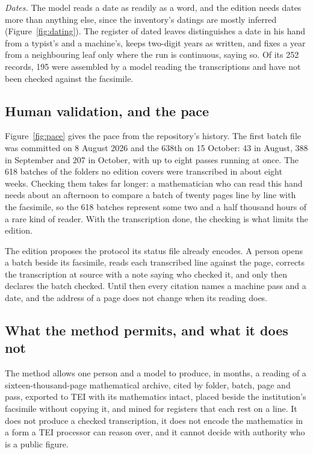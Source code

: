 \documentclass[11pt]{article}
\begin{document}
\emph{Dates.} The model reads a date as readily as a word, and the edition needs dates more than anything else, since the inventory's datings are mostly inferred (Figure~\ref{fig:dating}). The register of dated leaves distinguishes a date in his hand from a typist's and a machine's, keeps two-digit years as written, and fixes a year from a neighbouring leaf only where the run is continuous, saying so. Of its 252 records, 195 were assembled by a model reading the transcriptions and have not been checked against the facsimile.

\subsection{Human validation, and the pace}



Figure~\ref{fig:pace} gives the pace from the repository's history. The first batch file was committed on 8 August 2026 and the 638th on 15 October: 43 in August, 388 in September and 207 in October, with up to eight passes running at once. The 618 batches of the folders no edition covers were transcribed in about eight weeks. Checking them takes far longer: a mathematician who can read this hand needs about an afternoon to compare a batch of twenty pages line by line with the facsimile, so the 618 batches represent some two and a half thousand hours of a rare kind of reader. With the transcription done, the checking is what limits the edition.

The edition proposes the protocol its status file already encodes. A person opens a batch beside its facsimile, reads each transcribed line against the page, corrects the transcription at source with a note saying who checked it, and only then declares the batch checked. Until then every citation names a machine pass and a date, and the address of a page does not change when its reading does.

\subsection{What the method permits, and what it does not}

The method allows one person and a model to produce, in months, a reading of a sixteen-thousand-page mathematical archive, cited by folder, batch, page and pass, exported to TEI with its mathematics intact, placed beside the institution's facsimile without copying it, and mined for registers that each rest on a line. It does not produce a checked transcription, it does not encode the mathematics in a form a TEI processor can reason over, and it cannot decide with authority who is a public figure.
\end{document}
